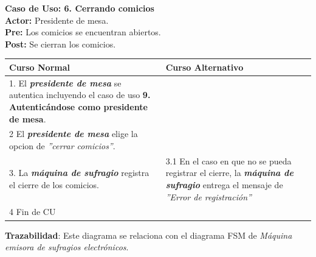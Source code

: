 \documentclass[spanish, 10pt,a4paper]{article}
\numberwithin{equation}{section} %
\begin{document}
\noindent\textbf{Caso de Uso: 6. Cerrando comicios}\\
\textbf{Actor: } Presidente de mesa.\\
\textbf{Pre: } Los comicios se encuentran abiertos.\\
\textbf{Post: } Se cierran los comicios.\\
\begin{table}[H]
  \centering
\bgroup
\def\arraystretch{1.3}
  \begin{tabular}{p{9cm} | p{7cm}}
    \hline
    Curso Normal & Curso Alternativo \\
    \hline
    \hline    
	1. El \textbf{\textit{presidente de mesa}} se autentica incluyendo el caso de uso \textbf{ 9. Autenticándose como presidente de mesa}. 
    \\
    \hline
    2 El \textbf{\textit{presidente de mesa}} elige la opcion de \textit{''cerrar comicios''}.
    & \\
    
    \hline
    3. La \textbf{\textit{máquina de sufragio}} registra el cierre de los comicios.
    &
    3.1 En el caso en que no se pueda registrar el cierre, la \textbf{\textit{máquina de sufragio}} entrega el mensaje de \textit{''Error de registración''}
    \\
    
    \hline
    4 Fin de CU
    & \\
    \hline
  \end{tabular}
\egroup
\end{table}
\vspace{-10px}
\noindent\textbf{Trazabilidad}: Este diagrama se relaciona con el diagrama FSM de \textit{Máquina emisora de sufragios electrónicos}.\\
\end{document}
